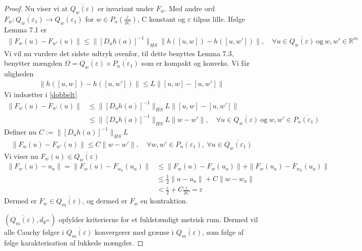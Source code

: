 \begin{proof}
  Nu viser vi at $\overline{Q_w(\varepsilon)}$ er invariant under $F_w$.
  Med andre ord $F_w : \overline{Q_w(\varepsilon_1)} \rightarrow \overline{Q_w(\varepsilon_1)}$ for $w \in P_n(\frac{\varepsilon}{2C})$, C konstant og $\varepsilon$ tilpas lille. Ifølge Lemma 7.1 er
  \begin{align} \label{dobbelt}
    \| F_w(u) - F_{w'}(u) \| \leq \| [D_uh(a)]^{-1} \|_{HS}
    \| h([u,w]) - h([u,w']) \|, \quad \forall u \in \overline{Q_w(\varepsilon)} \ \text{og} \ w,w' \in \mathbb{R}^m
  \end{align}
  Vi vil nu vurdere det sidste udtryk ovenfor, til dette benyttes Lemma 7.3, benytter mængden $\Omega = \overline{Q_w(\varepsilon)} \times \overline{P_n(\varepsilon_1)}$ som er kompakt og konveks.
  Vi får uligheden
  \begin{align*}
      \| h([u,w]) - h([u,w']) \| \leq L \| [u,w] - [u,w'] \|
  \end{align*}
  Vi indsætter i \eqref{dobbelt}
  \begin{align*}
    \| F_w(u) - F_{w'}(u) \| &\leq \| [D_uh(a)]^{-1} \|_{HS} L\| [u,w] - [u,w'] \| \\
    &\leq \| [D_uh(a)]^{-1} \|_{HS} L\| w - w' \|, \quad \forall u \in \overline{Q_w(\varepsilon)} \ \text{og} \ w,w' \in \overline{P_n(\varepsilon_1)}
  \end{align*}
  Definer nu $C := \| [D_uh(a)]^{-1} \|_{HS}L$
  \begin{align*}
    \| F_w(u) - F_{w'}(u) \| \leq C\| w - w' \|, \quad \forall w,w' \in P_n(\varepsilon_1), \ \forall u \in \overline{Q_w(\varepsilon_1)}
  \end{align*}
  Vi viser nu $F_w(u) \in \overline{Q_w(\varepsilon)}$
  \begin{align*}
    \| F_w(u) - u_a \| = \| F_w(u) - F_{w_a}(u_a) \|
    &\leq \| F_w(u) - F_w(u_a) \| + \| F_w(u_a) - F_{w_a}(u_a) \| \\
    &\leq \frac{1}{2} \| u - u_a \| + C \| w - w_a \| \\
    &< \frac{\varepsilon}{2} + C\frac{\varepsilon}{2C} = \varepsilon
   \end{align*}
   Dermed er $F_w \in \overline{Q_m(\varepsilon)}$, og dermed er $F_w$ en kontraktion.

   $(\overline{Q_m(\varepsilon)}, d_{\mathbb{R}^m})$ opfylder kriterierne for et fuldstændigt metrisk rum. Dermed vil alle Cauchy følger i $\overline{Q_m(\varepsilon)}$ konvergerer med grænse i $\overline{Q_m(\varepsilon)}$, som følge af følge karakterisation af lukkede mængder.


\end{proof}
